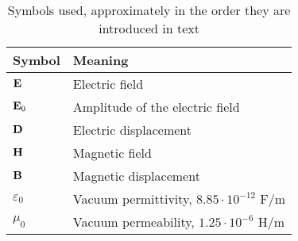 \begin{table}[ht]   \caption{Symbols used, approximately in the order they are introduced in text}  \label{tb_symbols} \centering 
\begin{tabular}{ll}
 \toprule
Symbol & Meaning	\\
 \hline
$\mathbf{E}$ 		& Electric field\\
$\mathbf{E}_0$ 		& Amplitude of the electric field\\
$\mathbf{D}$ 		& Electric displacement\\
$\mathbf{H}$ 		& Magnetic field\\
$\mathbf{B}$ 		& Magnetic displacement									\vspace{3mm}\\
 
$\varepsilon_0$ &Vacuum permittivity, $8.85\cdot10^{-12}$ F/m\\
$\mu_0$		&Vacuum permeability, $1.25\cdot10^{-6}$ H/m			\vspace{3mm}\\
 

\end{tabular}
\end{table}
